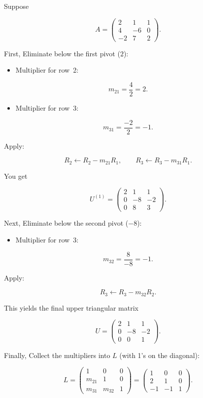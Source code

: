 \documentclass{article}
\begin{document}
Suppose

\[ A = \begin{pmatrix}
2 & 1 & 1 \\
4 & -6 & 0 \\
-2 & 7 & 2
\end{pmatrix}. \]

First, Eliminate below the first pivot ($2$):

\begin{itemize}
\item Multiplier for row 2:  
\end{itemize}
     
\[ m_{21} = \frac{4}{2} = 2. \]

\begin{itemize}
\item Multiplier for row 3:
\end{itemize}

\[ m_{31} = \frac{-2}{2} = -1. \]

   Apply:

\[ R_2 \leftarrow R_2 - m_{21} R_1,
   \qquad
   R_3 \leftarrow R_3 - m_{31} R_1. \]

You get

\[ U^{(1)} = \begin{pmatrix}
   2 & 1 & 1 \\
   0 & -8 & -2 \\
   0 & 8 & 3
   \end{pmatrix}. \]

Next, Eliminate below the second pivot ($-8$):

\begin{itemize}
\item Multiplier for row 3:  
\end{itemize}

\[ m_{32} = \frac{8}{-8} = -1. \]

Apply:

\[ R_3 \leftarrow R_3 - m_{32} R_2. \]

This yields the final upper triangular matrix

\[ U = \begin{pmatrix}
   2 & 1 & 1 \\
   0 & -8 & -2 \\
   0 & 0 & 1
   \end{pmatrix}. \]

Finally, Collect the multipliers into $L$ (with 1’s on the diagonal):

\[ L = \begin{pmatrix}
1 & 0 & 0 \\
m_{21} & 1 & 0 \\
m_{31} & m_{32} & 1
\end{pmatrix}
=
\begin{pmatrix}
1 & 0 & 0 \\
2 & 1 & 0 \\
-1 & -1 & 1
\end{pmatrix}. \]
\end{document}
